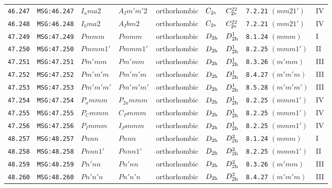 \documentclass[fleqn,10pt]{jsarticle}
\begin{document}
\begin{center}
\begin{longtable}{lllllllll}
\texttt{46.247} & \texttt{MSG:46.247} & $I_{a}ma2$ & $A_{I}m'm'2$ & orthorhombic & $C_{\rm 2v}$ & $C_{\rm 2v}^{22}$ & \texttt{7.2.21} $(mm21')$ & IV \\
\texttt{46.248} & \texttt{MSG:46.248} & $I_{b}ma2$ & $A_{I}bm2$ & orthorhombic & $C_{\rm 2v}$ & $C_{\rm 2v}^{22}$ & \texttt{7.2.21} $(mm21')$ & IV \\ \hline
\texttt{47.249} & \texttt{MSG:47.249} & $Pmmm$ & $Pmmm$ & orthorhombic & $D_{\rm 2h}$ & $D_{\rm 2h}^{1}$ & \texttt{8.1.24} $(mmm)$ & I \\
\texttt{47.250} & \texttt{MSG:47.250} & $Pmmm1'$ & $Pmmm1'$ & orthorhombic & $D_{\rm 2h}$ & $D_{\rm 2h}^{1}$ & \texttt{8.2.25} $(mmm1')$ & II \\
\texttt{47.251} & \texttt{MSG:47.251} & $Pm'mm$ & $Pm'mm$ & orthorhombic & $D_{\rm 2h}$ & $D_{\rm 2h}^{1}$ & \texttt{8.3.26} $(m'mm)$ & III \\
\texttt{47.252} & \texttt{MSG:47.252} & $Pm'm'm$ & $Pm'm'm$ & orthorhombic & $D_{\rm 2h}$ & $D_{\rm 2h}^{1}$ & \texttt{8.4.27} $(m'm'm)$ & III \\
\texttt{47.253} & \texttt{MSG:47.253} & $Pm'm'm'$ & $Pm'm'm'$ & orthorhombic & $D_{\rm 2h}$ & $D_{\rm 2h}^{1}$ & \texttt{8.5.28} $(m'm'm')$ & III \\
\texttt{47.254} & \texttt{MSG:47.254} & $P_{a}mmm$ & $P_{2a}mmm$ & orthorhombic & $D_{\rm 2h}$ & $D_{\rm 2h}^{1}$ & \texttt{8.2.25} $(mmm1')$ & IV \\
\texttt{47.255} & \texttt{MSG:47.255} & $P_{C}mmm$ & $C_{P}mmm$ & orthorhombic & $D_{\rm 2h}$ & $D_{\rm 2h}^{1}$ & \texttt{8.2.25} $(mmm1')$ & IV \\
\texttt{47.256} & \texttt{MSG:47.256} & $P_{I}mmm$ & $I_{P}mmm$ & orthorhombic & $D_{\rm 2h}$ & $D_{\rm 2h}^{1}$ & \texttt{8.2.25} $(mmm1')$ & IV \\ \hline
\texttt{48.257} & \texttt{MSG:48.257} & $Pnnn$ & $Pnnn$ & orthorhombic & $D_{\rm 2h}$ & $D_{\rm 2h}^{2}$ & \texttt{8.1.24} $(mmm)$ & I \\
\texttt{48.258} & \texttt{MSG:48.258} & $Pnnn1'$ & $Pnnn1'$ & orthorhombic & $D_{\rm 2h}$ & $D_{\rm 2h}^{2}$ & \texttt{8.2.25} $(mmm1')$ & II \\
\texttt{48.259} & \texttt{MSG:48.259} & $Pn'nn$ & $Pn'nn$ & orthorhombic & $D_{\rm 2h}$ & $D_{\rm 2h}^{2}$ & \texttt{8.3.26} $(m'mm)$ & III \\
\texttt{48.260} & \texttt{MSG:48.260} & $Pn'n'n$ & $Pn'n'n$ & orthorhombic & $D_{\rm 2h}$ & $D_{\rm 2h}^{2}$ & \texttt{8.4.27} $(m'm'm)$ & III \\

\end{longtable}
\end{center}
\end{document}

